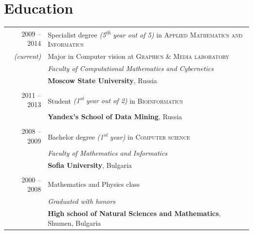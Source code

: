 \documentclass[a4paper,10pt]{article}
\def\myline{\color{linegray}\vline}
\begin{document}
\section{Education}
\hspace{0mm}\begin{tabular}{r!{\myline}p{14cm}}
        \textsc{2009 -- 2014}     &  Specialist degree {\small\textit{(5\textsuperscript{th} year out of 5)}} in \textsc{Applied Mathematics and Informatics}\\
        \small\textit{(current)}  &  Major in Computer vision at \textsc{Graphics \& Media laboratory}\\
                                  &  \textit{Faculty of Computational Mathematics and Cybernetics}\\
                                  &  \textbf{Moscow State University}, Russia\\

        \\
	\textsc{2011 -- 2013}     &  Student {\small\textit{(1\textsuperscript{st} year out of 2)}} in \textsc{Bioinformatics}\\
	                          &  \textbf{Yandex's School of Data Mining}, Russia\\
	

	\\
	\textsc{2008 -- 2009}     &  Bachelor degree {\small\textit{(1\textsuperscript{st} year)}} in \textsc{Computer science}\\
                                  &  \textit{Faculty of Mathematics and Informatics}\\
                                  &  \textbf{Sofia University}, Bulgaria\\
	
	\\
	\textsc{2000 -- 2008}     &  Mathematics and Physics class\\
                                  &  \textit{Graduated with honors}\\ %
                                  &  \textbf{High school of Natural Sciences and Mathematics}, Shumen, Bulgaria\\
\end{tabular}
\par\smallskip
\end{document}
